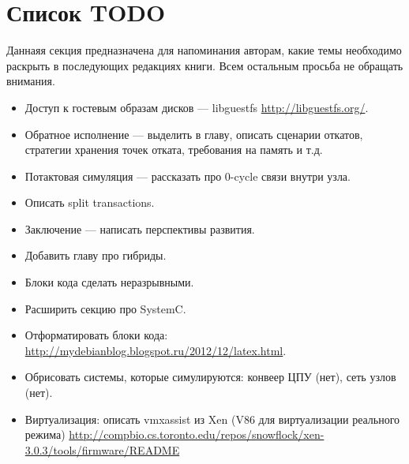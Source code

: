 \section*{Список TODO}

Даннаяя секция предназначена для напоминания авторам, какие темы необходимо раскрыть в последующих редакциях книги. Всем остальным просьба не обращать внимания.

\begin{itemize}
    \item Доступ к гостевым образам дисков --- libguestfs \url{http://libguestfs.org/}.
    \item Обратное исполнение --- выделить в главу, описать сценарии откатов, стратегии хранения точек отката, требования на память и т.д.
    \item Потактовая симуляция --- рассказать про 0-cycle связи внутри узла.
    \item Описать split transactions.
    \item Заключение --- написать перспективы развития.
	\item Добавить главу про гибриды.
	\item Блоки кода сделать неразрывными.
	\item Расширить секцию про SystemC.
	\item Отформатировать блоки кода: \url{http://mydebianblog.blogspot.ru/2012/12/latex.html}.
    \item Обрисовать системы, которые симулируются: конвеер ЦПУ (нет), сеть узлов (нет).
    \item Виртуализация: описать vmxassist из Xen (V86 для виртуализации реального режима) \url{http://compbio.cs.toronto.edu/repos/snowflock/xen-3.0.3/tools/firmware/README}
\end{itemize}


 

